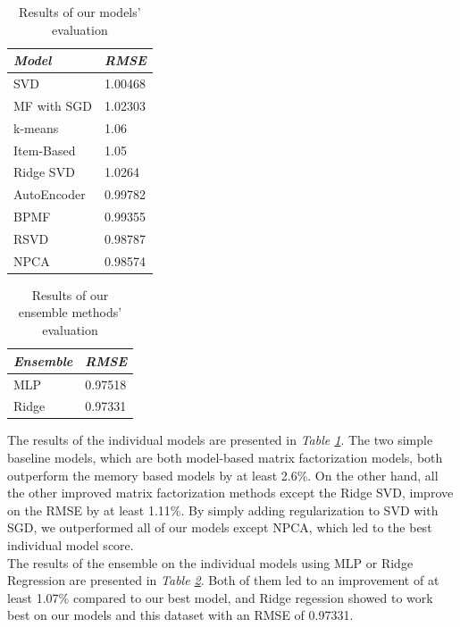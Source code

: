 \documentclass[10pt,conference,compsocconf]{IEEEtran}
\begin{document}
\begin{table}[h!]
	\centering
	\begin{tabular}{l|l}
		\textit{\textbf{Model}} & \textit{\textbf{RMSE}} \\
		\hline
		SVD                     &       1.00468                 \\
		MF with SGD             &       1.02303                 \\
		\hline	
		k-means                 &        1.06                \\
		Item-Based              &        1.05                \\
		Ridge SVD               &        1.0264                \\
		AutoEncoder             &        0.99782               \\
		BPMF                    &        0.99355               \\
		RSVD       	            &        0.98787                \\
		NPCA                    &        0.98574                      
	\end{tabular}
\caption{Results of our models' evaluation}
\label{tabres}
\end{table}

\begin{table}[h!]
	\centering
	\begin{tabular}{l|l}
		\textit{\textbf{Ensemble}} & \textit{\textbf{RMSE}} \\
		\hline
		MLP                     &      0.97518                 \\
		Ridge      	            &         0.97331                                   
	\end{tabular}
\caption{Results of our ensemble methods' evaluation}
\label{ensres}
\end{table}

The results of the individual models are presented in \emph{Table \ref{tabres}}.
The two simple baseline models, which are both model-based matrix factorization models, both outperform the memory based models by at least 2.6\%. On the other hand, all the other improved matrix factorization methods except the Ridge SVD, improve on the RMSE by at least 1.11\%. By simply adding regularization to SVD with SGD, we outperformed all of our models except NPCA, which led to the best individual model score.
\\
The results of the ensemble on the individual models using MLP or Ridge Regression are presented in \emph{Table \ref{ensres}}. Both of them led to an improvement of at least 1.07\% compared to our best model, and Ridge regession showed to work best on our models and this dataset with an RMSE of 0.97331.
\end{document}
